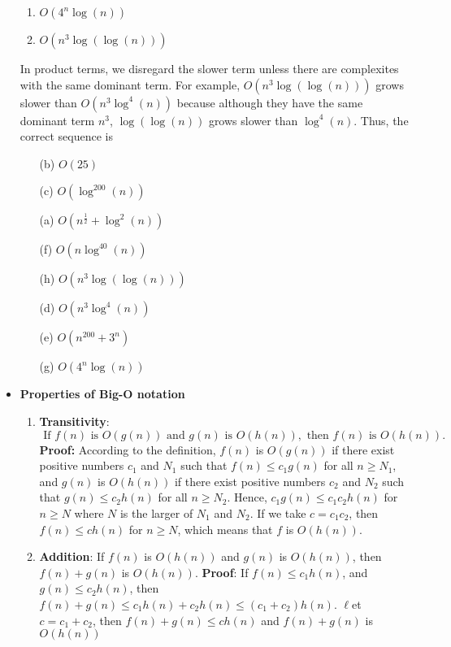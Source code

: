 \documentclass{report}
\begin{document}
\begin{itemize}
\begin{enumerate}[label=(\alph*)]
            \item $O(4^{n}\log(n)) $
            \item $O(n^{3}\log(\log(n))) $
        \end{enumerate}
        In product terms, we disregard the slower term unless there are complexites with the same dominant term. For example, $O(n^{3}\log(\log(n)))$ grows slower than $O(n^{3}\log^{4}(n))$ because although they have the same dominant term $n^{3}$, $\log(\log(n))$ grows slower than $\log^{4}(n)$. Thus, the correct sequence is 
        \begin{enumerate}[label=(\alph*)]
            \item [(b)] $O(25)$
            \item [(c)] $O(\log^{200}(n)) $
            \item [(a)] $O(n^{\frac{1}{2}} + \log^{2}(n)) $
            \item [(f)] $O(n\log^{40}(n)) $
            \item [(h)] $O(n^{3}\log(\log(n))) $
            \item [(d)] $O(n^{3}\log^{4}(n)) $
            \item [(e)] $O(n^{200} + 3^{n})$
            \item [(g)] $O(4^{n}\log(n))$
        \end{enumerate}
    \item \textbf{Properties of Big-O notation}
        \begin{enumerate}
            \item \textbf{Transitivity}: $\text{ If } f(n) \text{ is } O(g(n)) \text{ and } g(n) \text{ is } O(h(n)), \text{ then } f(n) \text{ is } O(h(n)).$ \\
            \bigbreak \noindent 
            \textbf{Proof:} According to the definition, $f(n)$ is $O(g(n))$ if there exist positive numbers $c_1$ and $N_1$ such that $f(n) \leq c_1 g(n)$ for all $n \geq N_1$, and $g(n)$ is $O(h(n))$ if there exist positive numbers $c_2$ and $N_2$ such that $g(n) \leq c_2 h(n)$ for all $n \geq N_2$. Hence, $c_1 g(n) \leq c_1 c_2 h(n)$ for $n \geq N$ where $N$ is the larger of $N_1$ and $N_2$. If we take $c = c_1 c_2$, then $f(n) \leq ch(n)$ for $n \geq N$, which means that $f$ is $O(h(n))$.
        \item \textbf{Addition}: If $f(n)$ is $O(h(n))$ and $g(n)$ is $O(h(n))$, then $f(n) + g(n)$ is $O(h(n))$.
            \bigbreak \noindent 
            \textbf{Proof}: If $f(n) \leq c_{1}h(n)$, and $g(n) \leq c_{2}h(n)$, then $f(n) + g(n) \leq c_{1}h(n) + c_{2}h(n) \leq (c_1 + c_2) h(n)$. $\ell$et $c = c_1 + c_2$, then $f(n) + g(n) \leq ch(n)$ and $f(n) + g(n)$ is $O(h(n)) $

\end{enumerate}
\end{itemize}
\end{document}
